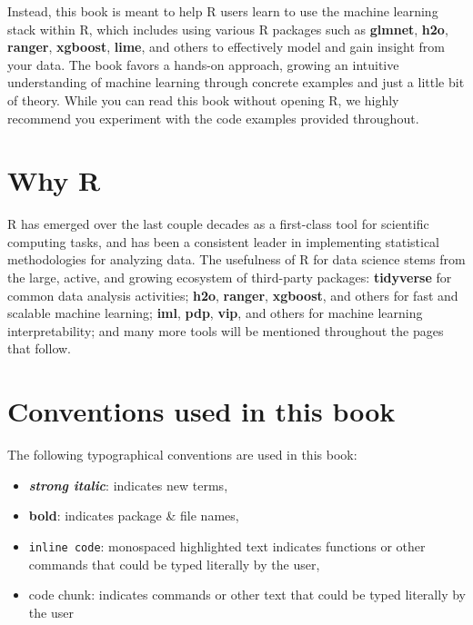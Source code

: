 \documentclass[]{krantz}
\providecommand{\tightlist}{%
  \setlength{\itemsep}{0pt}\setlength{\parskip}{0pt}}
\begin{document}
Instead, this book is meant to help R users learn to use the machine learning stack within R, which includes using various R packages such as \textbf{glmnet}, \textbf{h2o}, \textbf{ranger}, \textbf{xgboost}, \textbf{lime}, and others to effectively model and gain insight from your data. The book favors a hands-on approach, growing an intuitive understanding of machine learning through concrete examples and just a little bit of theory. While you can read this book without opening R, we highly recommend you experiment with the code examples provided throughout.

\hypertarget{why-r}{%
\section*{Why R}\label{why-r}}


R has emerged over the last couple decades as a first-class tool for scientific computing tasks, and has been a consistent leader in implementing statistical methodologies for analyzing data. The usefulness of R for data science stems from the large, active, and growing ecosystem of third-party packages: \textbf{tidyverse} for common data analysis activities; \textbf{h2o}, \textbf{ranger}, \textbf{xgboost}, and others for fast and scalable machine learning; \textbf{iml}, \textbf{pdp}, \textbf{vip}, and others for machine learning interpretability; and many more tools will be mentioned throughout the pages that follow.

\hypertarget{conventions-used-in-this-book}{%
\section*{Conventions used in this book}\label{conventions-used-in-this-book}}


The following typographical conventions are used in this book:

\begin{itemize}
\tightlist
\item
  \textbf{\emph{strong italic}}: indicates new terms,
\item
  \textbf{bold}: indicates package \& file names,
\item
  \texttt{inline\ code}: monospaced highlighted text indicates functions or other commands that could be typed literally by the user,
\item
  code chunk: indicates commands or other text that could be typed literally by the user
\end{itemize}
\end{document}
